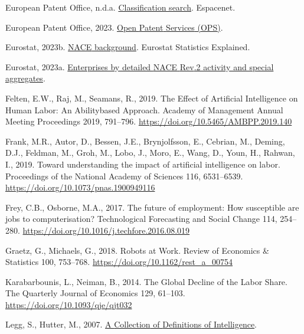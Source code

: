 \documentclass[
  11,
  a4paperpaper,
]{article}
\newlength{\cslhangindent}
\newenvironment{CSLReferences}[2] %
 {\begin{list}{}{%
  \setlength{\itemindent}{0pt}
  \setlength{\leftmargin}{0pt}
  \setlength{\parsep}{0pt}
  \ifodd #1
   \setlength{\leftmargin}{\cslhangindent}
   \setlength{\itemindent}{-1\cslhangindent}
  \fi
  \setlength{\itemsep}{#2\baselineskip}}}
 {\end{list}}
\begin{document}
\begin{CSLReferences}{1}{0}
European Patent Office, n.d.a.
\href{https://worldwide.espacenet.com/patent/cpc-browser}{Classification
search}. Espacenet.

European Patent Office, 2023.
\href{https://developers.epo.org/ops-v3-2/apis}{Open {Patent} {Services}
({OPS})}.

Eurostat, 2023b.
\href{https://ec.europa.eu/eurostat/statistics-explained/index.php?title=NACE_background}{{NACE}
background}. Eurostat Statistics Explained.

Eurostat, 2023a.
\href{https://ec.europa.eu/eurostat/databrowser/view/sbs_ovw_act/default/table?lang=en}{Enterprises
by detailed {NACE} {Rev}.2 activity and special aggregates}.

Felten, E.W., Raj, M., Seamans, R., 2019. The {Effect} of {Artificial}
{Intelligence} on {Human} {Labor}: {An} {Abilitybased} {Approach}.
Academy of Management Annual Meeting Proceedings 2019, 791--796.
\url{https://doi.org/10.5465/AMBPP.2019.140}

Frank, M.R., Autor, D., Bessen, J.E., Brynjolfsson, E., Cebrian, M.,
Deming, D.J., Feldman, M., Groh, M., Lobo, J., Moro, E., Wang, D., Youn,
H., Rahwan, I., 2019. Toward understanding the impact of artificial
intelligence on labor. Proceedings of the National Academy of Sciences
116, 6531--6539. \url{https://doi.org/10.1073/pnas.1900949116}

Frey, C.B., Osborne, M.A., 2017. The future of employment: {How}
susceptible are jobs to computerisation? Technological Forecasting and
Social Change 114, 254--280.
\url{https://doi.org/10.1016/j.techfore.2016.08.019}

Graetz, G., Michaels, G., 2018. Robots at {Work}. Review of Economics \&
Statistics 100, 753--768. \url{https://doi.org/10.1162/rest_a_00754}

Karabarbounis, L., Neiman, B., 2014. The {Global} {Decline} of the
{Labor} {Share}. The Quarterly Journal of Economics 129, 61--103.
\url{https://doi.org/10.1093/qje/qjt032}

Legg, S., Hutter, M., 2007. \href{http://arxiv.org/abs/0706.3639}{A
{Collection} of {Definitions} of {Intelligence}}.


\end{CSLReferences}
\end{document}

